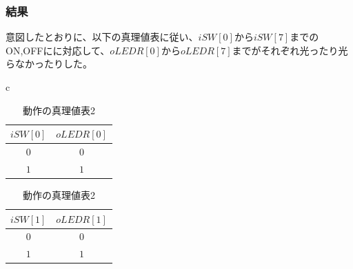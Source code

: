 \documentclass[a4paper]{jarticle}
\begin{document}
\subsubsection{結果}
意図したとおりに、以下の真理値表に従い、$iSW[0]$から$iSW[7]$までのON,OFFにに対応して、$oLEDR[0]$から$oLEDR[7]$までがそれぞれ光ったり光らなかったりした。
\begin{table}[!h]
	\begin{center}
		\begin{tabular}{c}
			\begin{minipage}{0.5\hsize}
				\begin{center}
					\caption{動作の真理値表1}
					\label{Work1TruthTable1}
					\begin{tabular}{|c|c|}
						\hline
						$iSW[0]$	&$oLEDR[0]$\\	\hline\hline
						$0$		&$0$\\		\hline
						$1$		&$1$\\		\hline
					\end{tabular}
				\end{center}
			\end{minipage}
			\begin{minipage}{0.5\hsize}
				\begin{center}
					\caption{動作の真理値表2}
					\label{Work1TruthTable2}
					\begin{tabular}{|c|c|}
						\hline
						$iSW[1]$	&$oLEDR[1]$\\	\hline\hline
						$0$		&$0$\\		\hline
						$1$		&$1$\\		\hline
					\end{tabular}
				\end{center}
			\end{minipage}
		\end{tabular}
	\end{center}
\end{table}
\end{document}
